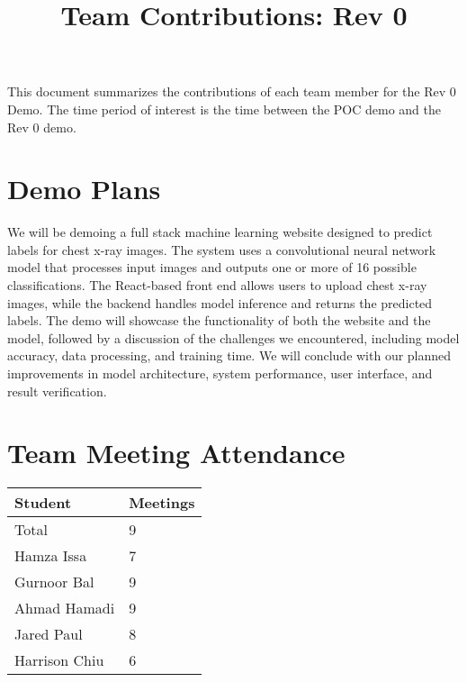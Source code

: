 \documentclass{article}
\title{Team Contributions: Rev 0\\\progname}
\author{\authname}
\date{}
\begin{document}
\maketitle

This document summarizes the contributions of each team member for the Rev 0
Demo.  The time period of interest is the time between the POC demo and the Rev
0 demo.

\section{Demo Plans}

We will be demoing a full stack machine learning website designed to predict labels for chest x-ray images. The system uses a convolutional neural network model that processes input images and outputs one or more of 16 possible classifications. The React-based front end allows users to upload chest x-ray images, while the backend handles model inference and returns the predicted labels. The demo will showcase the functionality of both the website and the model, followed by a discussion of the challenges we encountered, including model accuracy, data processing, and training time. We will conclude with our planned improvements in model architecture, system performance, user interface, and result verification.

\section{Team Meeting Attendance}


\begin{table}[H]
\centering
\begin{tabular}{ll}
\toprule
\textbf{Student} & \textbf{Meetings}\\
\midrule
Total & 9\\
Hamza Issa & 7\\
Gurnoor Bal & 9\\
Ahmad Hamadi & 9\\
Jared Paul & 8\\
Harrison Chiu & 6\\
\bottomrule
\end{tabular}
\end{table}
\end{document}
